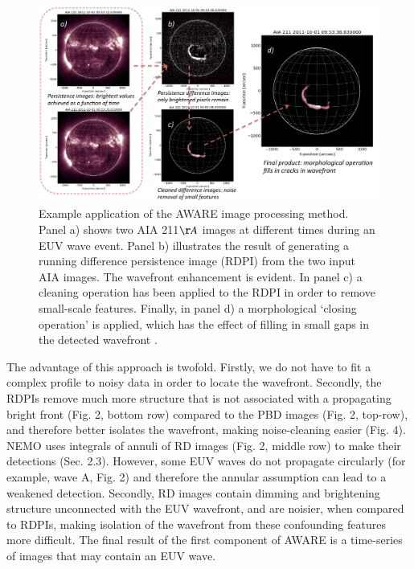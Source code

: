 \begin{figure}
\begin{center}
\includegraphics[width=16cm]{aware_figure4.pdf}
\caption{Example application of the AWARE image processing
  method. Panel a) shows two AIA 211$\AA$ images at different times
  during an EUV wave event. Panel b) illustrates the result of
  generating a running difference persistence image (RDPI) from the
  two input AIA images. The wavefront enhancement is evident. In panel
  c) a cleaning operation has been applied to the RDPI in order to
  remove small-scale features. Finally, in panel d) a morphological
  `closing operation' is applied, which has the effect of filling in
  small gaps in the detected wavefront
  \citep[e.g.][]{2002dip..book.....G}.}
\label{method_figure}
\end{center}
\end{figure}


The advantage of this approach is twofold. Firstly, we do not have to
fit a complex profile to noisy data in order to locate the
wavefront. Secondly, the RDPIs remove much more structure that is not
associated with a propagating bright front (Fig. 2, bottom row)
compared to the PBD images (Fig. 2, top-row), and therefore better
isolates the wavefront, making noise-cleaning easier (Fig. 4).  NEMO
\citep{2005SoPh..228..265P} uses integrals of annuli of RD images
(Fig. 2, middle row) to make their detections (Sec. 2.3). However, some
EUV waves do not propagate circularly (for example, wave A, Fig. 2)
and therefore the annular assumption can lead to a weakened detection.
Secondly, RD images contain dimming and brightening structure
unconnected with the EUV wavefront, and are noisier, when compared to
RDPIs, making isolation of the wavefront from these confounding
features more difficult. The final result of the first component of
AWARE is a time-series of images that may contain an EUV wave.  

